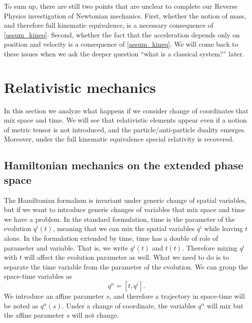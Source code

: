 To sum up, there are still two points that are unclear to complete our Reverse Physics investigation of Newtonian mechanics. First, whether the notion of mass, and therefore full kinematic equivalence, is a necessary consequence of \ref{assum_kineq}. Second, whether the fact that the acceleration depends only on position and velocity is a consequence of \ref{assum_kineq}. We will come back to these issues when we ask the deeper question ``what is a classical system?'' later.


\section{Relativistic mechanics}

In this section we analyze what happens if we consider change of coordinates that mix space and time. We will see that relativistic elements appear even if a notion of metric tensor is not introduced, and the particle/anti-particle duality emerges. Moreover, under the full kinematic equivalence special relativity is recovered.

\subsection{Hamiltonian mechanics on the extended phase space}


The Hamiltonian formalism is invariant under generic change of spatial variables, but if we want to introduce generic changes of variables that mix space and time we have a problem. In the standard formulation, time is the parameter of the evolution $q^i(t)$, meaning that we can mix the spatial variables $q^i$ while leaving $t$ alone. In the formulation extended by time, time has a double of role of parameter and variable. That is, we write $q^i(t)$ and $t(t)$. Therefore mixing $q^i$ with $t$ will affect the evolution parameter as well. What we need to do is to separate the time variable from the parameter of the evolution. We can group the space-time variables as
\begin{equation}
	q^\alpha = [t, q^i].
\end{equation}
We introduce an affine parameter $s$, and therefore a trajectory in space-time will be noted as $q^\alpha(s)$. Under a change of coordinate, the variables $q^\alpha$ will mix but the affine parameter $s$ will not change.

